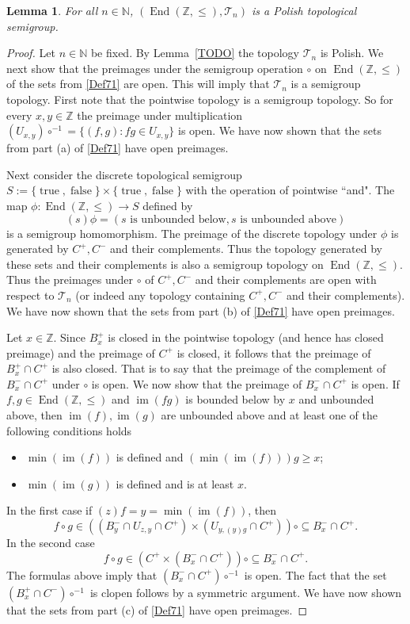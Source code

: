 \documentclass[11pt]{amsart}
\newtheorem{lemma}[theorem]{Lemma}
\theoremstyle{definition}
\newcommand{\N}{\mathbb N}
\newcommand{\Tau}{\mathcal T}
\newcommand{\Zendd}{\operatorname{End}(\mathbb Z, \leq)}
\newcommand{\Z}{\mathbb Z}
\newcommand{\im}{\operatorname{im}}
\begin{document}
\begin{lemma}\label{*}
  For all \(n\in \N\),  \((\Zendd, \Tau_n)\) is a Polish topological semigroup.
\end{lemma}
\begin{proof}
Let \(n\in \N\) be fixed.
By Lemma~\ref{TODO} the topology \(\Tau_n\) is Polish.
We next show that the preimages under the semigroup operation \(\circ\) on $\Zendd$ of the sets from \cref{Def71} are open. This will imply that  \(\Tau_n\) is a semigroup topology. First note that the pointwise topology is a semigroup topology. So for every $x,y\in\Z$ the preimage under multiplication $(U_{x,y})\circ^{-1}=\{(f,g):fg\in U_{x,y}\}$ is open.
We have now shown that the sets from part (a) of \cref{Def71} have open preimages.

Next consider the discrete topological semigroup \(S:=\{\operatorname{true}, \operatorname{false}\}{\times}\{\operatorname{true}, \operatorname{false}\}\) with the operation of pointwise ``and". 
The map \(\phi: \Zendd \to S\) defined by 
\[(s)\phi=(s\text{ is unbounded below}, s\text{ is unbounded above})\]
is a semigroup homomorphism. The preimage of the discrete topology under \(\phi\) is generated by \(C^+, C^-\) and their complements. Thus the topology generated by these sets and their complements is also a semigroup topology on \(\Zendd\). Thus the preimages under $\circ$ of \(C^+,C^-\) and their complements are open with respect to \(\Tau_n\) (or indeed any topology containing \(C^+,C^-\) and their complements). We have now shown that the sets from part (b) of \cref{Def71} have open preimages.
 
Let \(x\in \mathbb{Z}\). Since \(B_x^+\) is closed in the pointwise topology (and hence has closed preimage) and the preimage of \(C^+\) is closed, it follows that the preimage of \(B_x^+\cap C^+\) is also closed. 
That is to say that the preimage of the complement of \(B_x^-\cap C^{+}\) under \(\circ\) is open. We now show that the preimage of \(B_x^-\cap C^{+}\) is open.
If \(f,g\in \Zendd\) and \(\im(fg)\) is bounded below by \(x\) and unbounded above, then \(\im(f), \im(g)\) are unbounded above and at least one of the following conditions holds
    \begin{itemize}
        \item  \(\min(\im(f))\) is defined and \((\min(\im(f)))g \geq x\);
        \item \(\min(\im(g))\) is defined and is at least \(x\).
    \end{itemize}
    In the first case if \((z)f=y=\min(\im(f))\), then  \[f\circ g\in ((B_{y}^-\cap U_{z,y}\cap C^+)\times (U_{y,(y)g}\cap C^+))\circ \subseteq B_x^-\cap C^+.\] In the second case \[f \circ g\in (C^+ \times (B_{x}^-\cap C^+))\circ \subseteq B_x^-\cap C^+.\]
    The formulas above imply that $(B_x^-\cap C^+)\circ^{-1}$ is open.
    The fact that the set \((B_x^+\cap C^{-})\circ^{-1}\) is clopen follows by a symmetric argument. We have now shown that the sets from part (c) of \cref{Def71} have open preimages.


\end{proof}
\end{document}
